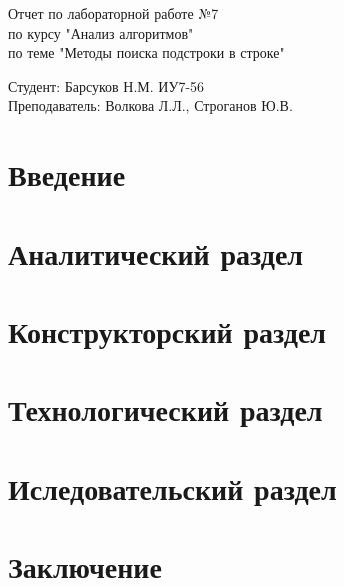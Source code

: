 \documentclass[a4paper, 14pt]{article}
\begin{document}
	\begin{titlepage}
		\begin{center}
			\begin{LARGE}
				Отчет по лабораторной работе №7\\
				по курсу "Анализ алгоритмов"\\
				по теме "Методы поиска подстроки в строке"
			\end{LARGE}
			
			\begin{Large}
				\vspace{10cm}
				Студент: Барсуков Н.М. ИУ7-56\\
				Преподаватель: Волкова Л.Л.,
				Строганов Ю.В.
			\end{Large}
		\end{center}
	\end{titlepage}
	
	\newpage
	\tableofcontents
	
	\newpage
	\section*{Введение}
	
	
	\newpage
	\section{Аналитический раздел}
	
	
	\newpage
	\section{Конструкторский раздел}
	
	
	\newpage
	\section{Технологический раздел}
	
	
	\newpage
	\section{Иследовательский раздел}
	
	
	\newpage
	\section{Заключение}
	
	
	\newpage
	\begin{thebibliography}{1}
		
	\end{thebibliography}
\end{document}
